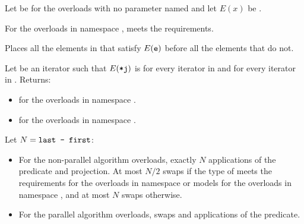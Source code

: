 \begin{itemdescr}
\pnum
Let  be 
for the overloads with no parameter named 
and let $E(x)$ be .

\pnum
\expects
For the overloads in namespace ,
 meets
the  requirements.

\pnum
\effects
Places all the elements  in 
that satisfy $E(\tcode{e})$ before all the elements that do not.

\pnum
\returns
Let  be an iterator such that $E(\tcode{*j})$ is
 for every iterator  in  and
 for every iterator  in .
Returns:
\begin{itemize}
\item {} for the overloads in namespace .
\item {} for the overloads in namespace .
\end{itemize}


\pnum
\complexity
Let $N = \tcode{last - first}$:
\begin{itemize}
\item
  For the non-parallel algorithm overloads,
  exactly $N$ applications of the predicate and projection.
  At most $N / 2$ swaps if the type of  meets
  the  requirements
  for the overloads in namespace  or
  models 
  for the overloads in namespace ,
  and at most $N$ swaps otherwise.
\item
  For the parallel algorithm overloads,
   swaps and  applications of the predicate.
\end{itemize}
\end{itemdescr}

